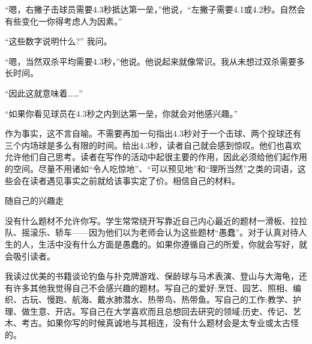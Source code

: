 “嗯，右撇子击球员需要4.3秒抵达第一垒，”他说，“左撇子需要4.1或4.2秒。自然会有些变化一你得考虑人为因素。”

“这些数字说明什么?” 我问。

“嗯，当然双杀平均需要4.3秒，”他说。他说起来就像常识。我从未想过双杀需要多长时间。

“因此这就意味着……”

“如果你看见球员在4.3秒之内到达第一垒，你就会对他感兴趣。”

作为事实，这不言自喻。不需要再加一句指出4.3秒对于一个击球、两个投球还有三个内场球是多么有限的时间。给出4.3秒，读者自己就会感到惊叹。他们也喜欢允许他们自己思考。读者在写作的活动中起很主要的作用，因此必须给他们起作用的空间。尽量不用诸如“令人吃惊地”、“可以预见地”和“理所当然”之类的词语，这些会在读者遇见事实之前就给该事实定了价。相信自己的材料。

随自己的兴趣走

没有什么题材不允许你写。学生常常绕开写靠近自己内心最近的题材一滑板、拉拉队、摇滚乐、轿车——因为他们以为老师会认为这些题材“愚蠢”。对于认真对待人生的人，生活中没有什么方面是愚蠢的。如果你遵循自己的所爱，你就会写好，就会吸引读者。

我读过优美的书籍谈论钓鱼与扑克牌游戏、保龄球与马术表演、登山与大海龟，还有许多其他我觉得自己不会感兴趣的题材。写自己的爱好:烹饪、园艺、照相、编织、古玩、慢跑、航海、戴水肺潜水、热带鸟、热带鱼。写自己的工作:教学、护理、做生意、开店。写自己在大学喜欢而且总想回去研究的领域:历史、传记、艺木、考古。如果你写的时候真诚地与其相连，没有什么题材会是太专业或太古怪的。